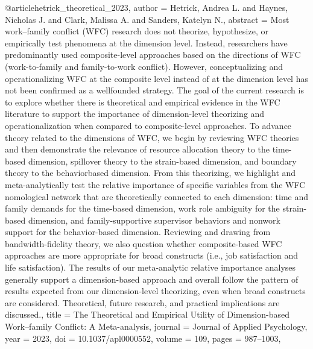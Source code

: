 @article{hetrick_theoretical_2023,
  author = {Hetrick, Andrea L. and Haynes, Nicholas J. and Clark, Malissa A. and Sanders, Katelyn N.},
  abstract = {Most work–family conflict (WFC) research does not theorize, hypothesize, or empirically test phenomena at the dimension level. Instead, researchers have predominantly used composite-level approaches based on the directions of WFC (work-to-family and family-to-work conflict). However, conceptualizing and operationalizing WFC at the composite level instead of at the dimension level has not been confirmed as a wellfounded strategy. The goal of the current research is to explore whether there is theoretical and empirical evidence in the WFC literature to support the importance of dimension-level theorizing and operationalization when compared to composite-level approaches. To advance theory related to the dimensions of WFC, we begin by reviewing WFC theories and then demonstrate the relevance of resource allocation theory to the time-based dimension, spillover theory to the strain-based dimension, and boundary theory to the behaviorbased dimension. From this theorizing, we highlight and meta-analytically test the relative importance of specific variables from the WFC nomological network that are theoretically connected to each dimension: time and family demands for the time-based dimension, work role ambiguity for the strain-based dimension, and family-supportive supervisor behaviors and nonwork support for the behavior-based dimension. Reviewing and drawing from bandwidth-fidelity theory, we also question whether composite-based WFC approaches are more appropriate for broad constructs (i.e., job satisfaction and life satisfaction). The results of our meta-analytic relative importance analyses generally support a dimension-based approach and overall follow the pattern of results expected from our dimension-level theorizing, even when broad constructs are considered. Theoretical, future research, and practical implications are discussed.},
  title = {{The} {Theoretical} {and} {Empirical} {Utility} {of} {Dimension-based} {Work–family} {Conflict}: {A} {Meta-analysis}},
  journal = {Journal of Applied Psychology},
  year = {2023},
  doi = {10.1037/apl0000552},
  volume = {109},
  pages = {987--1003},
}

